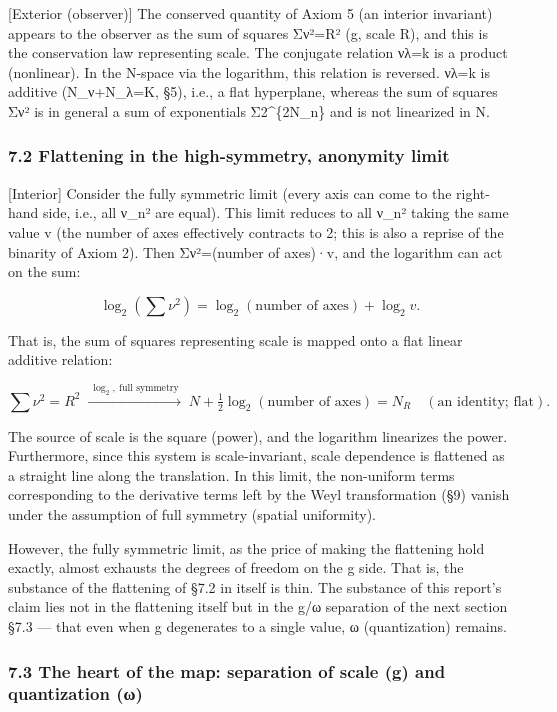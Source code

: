 \documentclass[11pt]{ltjsarticle}
\begin{document}
{[}Exterior (observer){]} The conserved quantity of Axiom 5 (an interior
invariant) appears to the observer as the sum of squares Σν²=R² (g,
scale R), and this is the conservation law representing scale. The
conjugate relation νλ=k is a product (nonlinear). In the N-space via the
logarithm, this relation is reversed. νλ=k is additive (N\_ν+N\_λ=K,
§5), i.e., a flat hyperplane, whereas the sum of squares Σν² is in
general a sum of exponentials Σ2\^{}\{2N\_n\} and is not linearized in
N.

\subsubsection{7.2 Flattening in the high-symmetry, anonymity
limit}\label{flattening-in-the-high-symmetry-anonymity-limit}

{[}Interior{]} Consider the fully symmetric limit (every axis can come
to the right-hand side, i.e., all ν\_n² are equal). This limit reduces
to all ν\_n² taking the same value v (the number of axes effectively
contracts to 2; this is also a reprise of the binarity of Axiom 2). Then
Σν²=(number of axes)·v, and the logarithm can act on the sum:

\[\log_2\!\left(\sum\nu^2\right) = \log_2(\text{number of axes}) + \log_2 v.\]

That is, the sum of squares representing scale is mapped onto a flat
linear additive relation:

\[\sum\nu^2 = R^2 \;\xrightarrow{\ \log_2,\ \text{full symmetry}\ }\; N + \tfrac12\log_2(\text{number of axes}) = N_R \quad(\text{an identity; flat}).\]

The source of scale is the square (power), and the logarithm linearizes
the power. Furthermore, since this system is scale-invariant, scale
dependence is flattened as a straight line along the translation. In
this limit, the non-uniform terms corresponding to the derivative terms
left by the Weyl transformation (§9) vanish under the assumption of full
symmetry (spatial uniformity).

However, the fully symmetric limit, as the price of making the
flattening hold exactly, almost exhausts the degrees of freedom on the g
side. That is, the substance of the flattening of §7.2 in itself is
thin. The substance of this report's claim lies not in the flattening
itself but in the g/ω separation of the next section §7.3 --- that even
when g degenerates to a single value, ω (quantization) remains.

\subsubsection{7.3 The heart of the map: separation of scale (g) and
quantization
(ω)}\label{the-heart-of-the-map-separation-of-scale-g-and-quantization-ux3c9}
\end{document}
